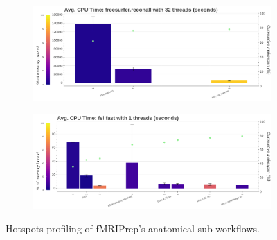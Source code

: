\documentclass[conference]{IEEEtran}
\begin{document}
\begin{figure}[ht!]
	\begin{subfigure}[t]{0.49\textwidth}
		\caption{}
		\label{subfig:hotspots-32threads-freesurfer-reconall}
		\includegraphics[width=\textwidth]{figures/hotspots-32threads-freesurfer-reconall.png}
	\end{subfigure}
	\hfill
	\begin{subfigure}[t]{0.49\textwidth}
		\caption{}
		\label{subfig:hotspots-fsl-fast}
		\includegraphics[width=\textwidth]{figures/hotspots-1thread-fsl-fast.png}
	\end{subfigure}

	\caption{Hotspots profiling of fMRIPrep's anatomical sub-workflows.}
	\label{fig:hotspots-fmriprep-anat-subworkflow}
	
\end{figure}
\end{document}
